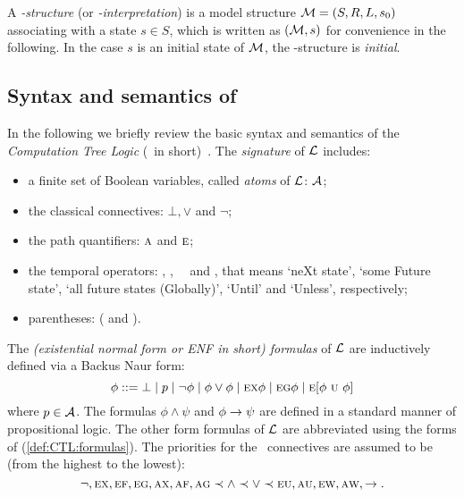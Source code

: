 \documentclass{article}
\begin{document}
A {\em \MPK-structure} (or {\em \MPK-interpretation}) is a model structure
${\cal M}=(S, R, L, s_0)$ associating
with a state $s\in S$, which is written as $({\cal M},s)$ for convenience in the following.
In the case $s$ is an initial state of $\cal M$, the \MPK-structure is {\em initial}.



\subsection{Syntax and semantics of \CTL}
In the following we briefly review the basic syntax and semantics
of the {\em Computation Tree Logic}
(\CTL\ in short)~\cite{DBLP:journals/toplas/ClarkeES86}.
The {\em signature} of $\cal L$ includes:
\begin{itemize}
  \item a finite set of Boolean variables, called {\em atoms} of $\cal L$: $\cal A$;
  \item the classical connectives: $\bot,\lor$ and $\neg$;
  \item the path quantifiers: $\textsc{a}$ and $\textsc{e}$;
  \item the temporal operators: \NEXT, \FUTURE, \GLOBAL\, \UNTIL\ and \UNLESS, that
  means `neXt state', `some Future state', `all future states (Globally)', `Until' and `Unless', respectively;
  \item parentheses: ( and ).
\end{itemize}

The {\em (existential normal form or ENF in short) formulas} of
$\cal L$ are inductively defined via a Backus Naur form:
\begin{equation}\label{def:CTL:formulas}
  \phi ::= \bot\mid p \mid\neg\phi \mid \phi\lor\phi \mid
    \EXIST \NEXT \phi \mid
    \EXIST \GLOBAL \phi \mid
    \EXIST [\phi\ \UNTIL\ \phi]%
\end{equation}
where $p\in\cal A$. The formulas $\phi\land\psi$ and $\phi\rightarrow\psi$
are defined in a standard manner of propositional logic.
The other form formulas of $\cal L$ are abbreviated
using the forms of (\ref{def:CTL:formulas}).
The priorities for the \CTL\ connectives are assumed to be (from the highest to the lowest):
\begin{equation*}
  \neg, \textsc{e}\textsc{x}, \textsc{e}\textsc{f}, \textsc{e}\textsc{g}, \textsc{a}\textsc{x}, \textsc{a}\textsc{f}, \textsc{a}\textsc{g}
  \prec \land \prec \lor \prec \textsc{e}\textsc{u}, \textsc{a}\textsc{u}, \textsc{e} \textsc{w}, \textsc{a} \textsc{w}, \rightarrow.
\end{equation*}
\end{document}
